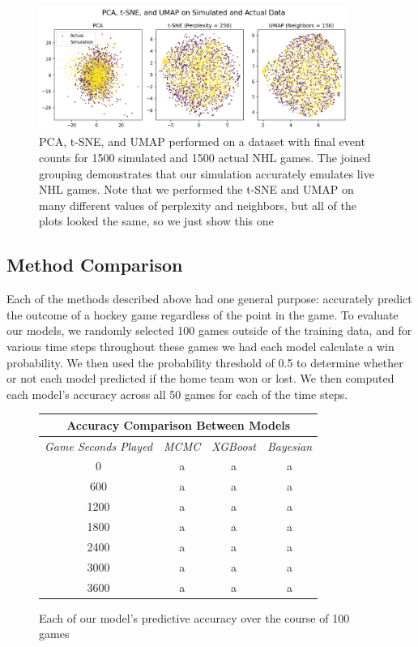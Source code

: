 \documentclass[11pt]{article}
\begin{document}
\begin{figure}
    \centering
    \includegraphics[width=0.9\textwidth]{images/pca_tsne_umap_sim_act.png}
    \caption{PCA, t-SNE, and UMAP performed on a dataset with final event counts for 1500 simulated and 1500 actual NHL games. The joined grouping demonstrates that our simulation accurately emulates live NHL games. Note that we performed the t-SNE and UMAP on many different values of perplexity and neighbors, but all of the plots looked the same, so we just show this one}
    \label{fig:simulation_v_actual}
\end{figure}

\subsection{Method Comparison}
Each of the methods described above had one general purpose: accurately predict the outcome of a hockey game regardless of the point in the game. To evaluate our models, we randomly selected 100 games outside of the training data, and for various time steps throughout these games we had each model calculate a win probability. We then used the probability threshold of 0.5 to determine whether or not each model predicted if the home team won or lost. We then computed each model's accuracy across all 50 games for each of the time steps.

\begin{figure}
    \centering
    \begin{tabular}{ |c|c|c|c| } 
    \hline
        \multicolumn{4}{|c|}{\textbf{Accuracy Comparison Between Models}} \\
     \hline
     \textit{Game Seconds Played} & \textit{MCMC} & \textit{XGBoost} & \textit{Bayesian} \\ 
     \hline
     0 & a & a & a \\ 
     \hline
     600 & a & a & a \\ 
     \hline
     1200 & a & a & a \\
    \hline
    1800 & a & a & a \\
    \hline
    2400 & a & a & a \\
    \hline
    3000 & a & a & a \\
    \hline
    3600 & a & a & a \\
    \hline
    \end{tabular}
    \caption{Each of our model's predictive accuracy over the course of 100 games}
    \label{fig:game_accuracies}
\end{figure}
\end{document}
